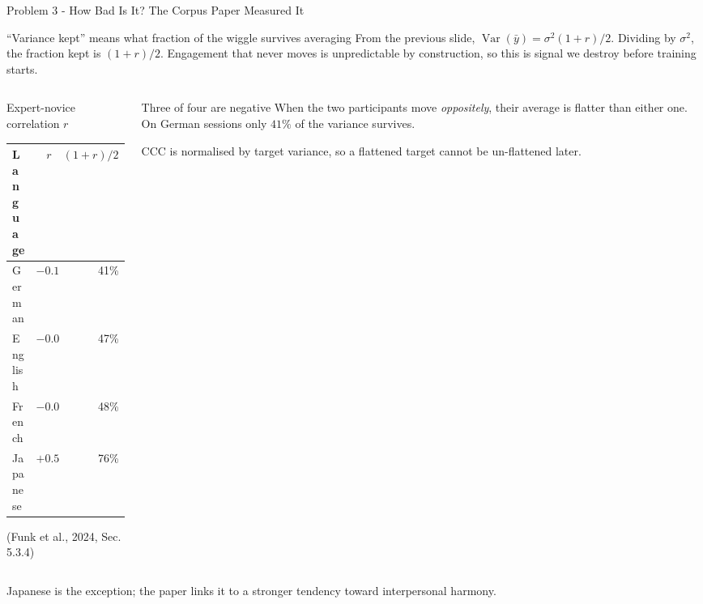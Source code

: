 \documentclass[aspectratio=169]{beamer}
\begin{document}
	\begin{frame}{Problem 3 - How Bad Is It? The Corpus Paper Measured It}
		\begin{block}{``Variance kept'' means what fraction of the wiggle survives averaging}
			\small
			From the previous slide, $\operatorname{Var}(\bar{y}) = \sigma^2(1+r)/2$. Dividing by
			$\sigma^2$, the fraction kept is $(1+r)/2$. Engagement that never moves is
			unpredictable by construction, so this is signal we destroy before training starts.
		\end{block}
		\vspace{0.2em}
		\begin{columns}[onlytextwidth]
			\begin{column}{0.50\textwidth}
				\begin{block}{Expert-novice correlation $r$}
					\small
					\begin{tabular}{lrr}
						Language & $r$ & $(1+r)/2$ \\
						\hline
						German & $-0.19$ & 41\% \\
						English & $-0.07$ & 47\% \\
						French & $-0.05$ & 48\% \\
						Japanese & $+0.51$ & 76\% \\
					\end{tabular}
					\vspace{0.2em}

					\footnotesize (Funk et al., 2024, Sec. 5.3.4)
				\end{block}
			\end{column}
			\begin{column}{0.46\textwidth}
				\begin{alertblock}{Three of four are negative}
					\small
					When the two participants move \emph{oppositely}, their average is flatter than
					either one. On German sessions only $41\%$ of the variance survives.
					\vspace{0.2em}

					CCC is normalised by target variance, so a flattened target cannot be
					un-flattened later.
				\end{alertblock}
			\end{column}
		\end{columns}
		\vspace{0.3em}
		\centering\small
		Japanese is the exception; the paper links it to a stronger tendency toward
		interpersonal harmony.
	\end{frame}
\end{document}
